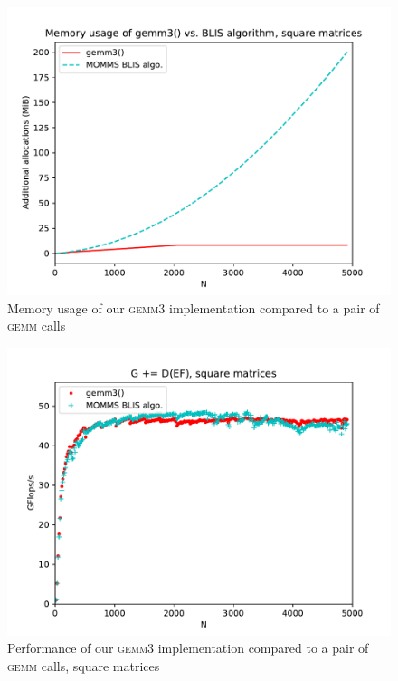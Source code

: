 \documentclass[12pt]{article}
\newcommand*{\gemmt}{{\textsc{gemm3}}}
\newcommand*{\gemm}{{\textsc{gemm}}}
\begin{document}
\begin{figure}
  \centering
  \includegraphics[height=0.40\textheight]{../results/earwig2/gemm3_memory}
  \caption{Memory usage of our \gemmt{} implementation compared to a pair of \gemm{} calls}
  \label{fig:bc_square_mem}
\end{figure}

\begin{figure}
  \centering
  \includegraphics[height=0.40\textheight]{../results/earwig2/gemm3}
  \caption{Performance of our \gemmt{} implementation compared to a pair of \gemm{} calls, square matrices}
  \label{fig:bc_square}
\end{figure}
\end{document}

